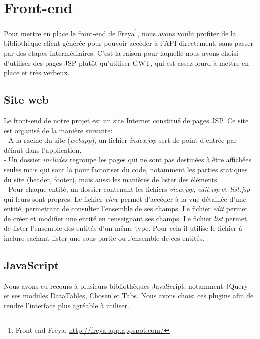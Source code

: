 \chapter{Front-end}

Pour mettre en place le front-end de Freya\footnote{Front-end Freya:
\url{http://freya-app.appspot.com/}}, nous avons voulu profiter de la
bibliothèque client générée pour pouvoir accéder à l’API directement, sans
passer par des étapes intermédiaires. C’est la raison pour laquelle nous avons
choisi d’utiliser des pages JSP plutôt qu’utiliser GWT, qui est assez lourd à
mettre en place et très verbeux.

\section{Site web}

Le front-end de notre projet est un site Internet constitué de pages JSP. Ce
site est organisé de la manière suivante:\\

- A la racine du site (\emph{webapp}), un fichier \emph{index.jsp} sert de point
d’entrée par défaut dans l’application.\\

- Un dossier \emph{includes} regroupe les pages qui ne sont pas destinées à être
affichées seules mais qui sont là pour factoriser du code, notamment les parties
statiques du site (header, footer), mais aussi les manières de lister des
éléments.\\

- Pour chaque entité, un dossier contenant les fichiers \emph{view.jsp},
\emph{edit.jsp} et \emph{list.jsp} qui leurs sont propres. Le fichier
\emph{view} permet d’accéder à la vue détaillée d’une entité, permettant de
consulter l’ensemble de ses champs. Le fichier \emph{edit} permet de créer et
modifier une entité en renseignant ses champs. Le fichier \emph{list} permet de
lister l’ensemble des entités d’un même type. Pour cela il utilise le fichier à
inclure sachant lister une sous-partie ou l’ensemble de ces entités.

\newpage
\section{JavaScript}


Nous avons eu recours à plusieurs bibliothèques JavaScript, notamment JQuery et
ses modules DataTables, Chosen et Tabs.
Nous avons choisi ces plugins afin de rendre l’interface plus agréable à
utiliser.\\

